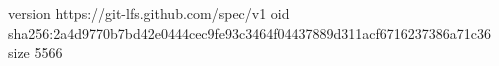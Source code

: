 version https://git-lfs.github.com/spec/v1
oid sha256:2a4d9770b7bd42e0444cec9fe93c3464f04437889d311acf6716237386a71c36
size 5566
